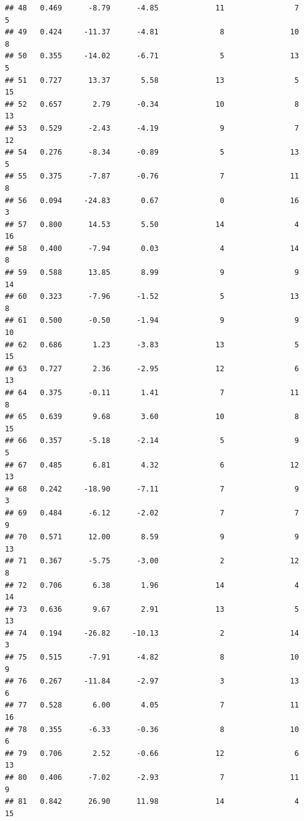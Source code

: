 \documentclass[]{book}
\begin{document}
\begin{verbatim}
## 48   0.469      -8.79      -4.85             11                7        5
## 49   0.424     -11.37      -4.81              8               10        8
## 50   0.355     -14.02      -6.71              5               13        5
## 51   0.727      13.37       5.58             13                5       15
## 52   0.657       2.79      -0.34             10                8       13
## 53   0.529      -2.43      -4.19              9                7       12
## 54   0.276      -8.34      -0.89              5               13        5
## 55   0.375      -7.87      -0.76              7               11        8
## 56   0.094     -24.83       0.67              0               16        3
## 57   0.800      14.53       5.50             14                4       16
## 58   0.400      -7.94       0.03              4               14        8
## 59   0.588      13.85       8.99              9                9       14
## 60   0.323      -7.96      -1.52              5               13        8
## 61   0.500      -0.50      -1.94              9                9       10
## 62   0.686       1.23      -3.83             13                5       15
## 63   0.727       2.36      -2.95             12                6       13
## 64   0.375      -0.11       1.41              7               11        8
## 65   0.639       9.68       3.60             10                8       15
## 66   0.357      -5.18      -2.14              5                9        5
## 67   0.485       6.81       4.32              6               12       13
## 68   0.242     -18.90      -7.11              7                9        3
## 69   0.484      -6.12      -2.02              7                7        9
## 70   0.571      12.00       8.59              9                9       13
## 71   0.367      -5.75      -3.00              2               12        8
## 72   0.706       6.38       1.96             14                4       14
## 73   0.636       9.67       2.91             13                5       13
## 74   0.194     -26.82     -10.13              2               14        3
## 75   0.515      -7.91      -4.82              8               10        9
## 76   0.267     -11.84      -2.97              3               13        6
## 77   0.528       6.00       4.05              7               11       16
## 78   0.355      -6.33      -0.36              8               10        6
## 79   0.706       2.52      -0.66             12                6       13
## 80   0.406      -7.02      -2.93              7               11        9
## 81   0.842      26.90      11.98             14                4       15

\end{verbatim}
\end{document}
